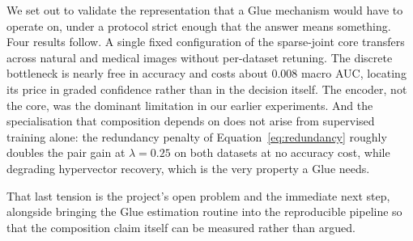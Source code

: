 \documentclass[conference]{IEEEtran}
\begin{document}
We set out to validate the representation that a Glue mechanism would have to
operate on, under a protocol strict enough that the answer means something. Four
results follow. A single fixed configuration of the sparse-joint core transfers
across natural and medical images without per-dataset retuning. The discrete
bottleneck is nearly free in accuracy and costs about $0.008$ macro AUC,
locating its price in graded confidence rather than in the decision itself. The
encoder, not the core, was the dominant limitation in our earlier experiments.
And the specialisation that composition depends on does not arise from
supervised training alone: the redundancy penalty of
Equation~\ref{eq:redundancy} roughly doubles the pair gain at $\lambda=0.25$ on
both datasets at no accuracy cost, while degrading hypervector recovery, which
is the very property a Glue needs.

That last tension is the project's open problem and the immediate next step,
alongside bringing the Glue estimation routine into the reproducible pipeline so
that the composition claim itself can be measured rather than argued.


\renewcommand\IEEEbibitemsep{0pt plus .3pt}


\end{document}

